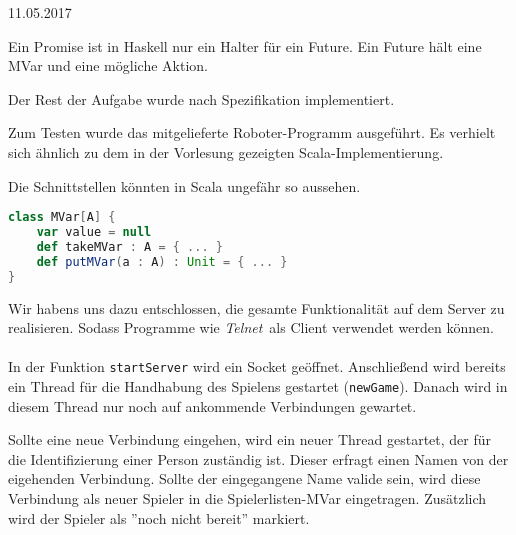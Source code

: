\documentclass{rp}
\begin{document}


{11.05.2017} %

%
Ein Promise ist in Haskell nur ein Halter für ein Future. Ein Future hält eine MVar und eine mögliche Aktion.

Der Rest der Aufgabe wurde nach Spezifikation implementiert. 

Zum Testen wurde das mitgelieferte Roboter-Programm ausgeführt. Es verhielt sich ähnlich zu dem in der Vorlesung gezeigten Scala-Implementierung.

Die Schnittstellen könnten in Scala ungefähr so aussehen. 
\begin{lstlisting}[language=scala]
class MVar[A] {
    var value = null
    def takeMVar : A = { ... }
    def putMVar(a : A) : Unit = { ... }
}
\end{lstlisting}

Wir habens uns dazu entschlossen, die gesamte Funktionalität auf dem Server zu realisieren. Sodass Programme wie \textit{Telnet} als Client verwendet werden können.\\\\

In der Funktion \texttt{startServer} wird ein Socket geöffnet. Anschließend wird bereits ein Thread für die Handhabung des Spielens gestartet (\texttt{newGame}). Danach wird in diesem Thread nur noch auf ankommende Verbindungen gewartet. 

Sollte eine neue Verbindung eingehen, wird ein neuer Thread gestartet, der für die Identifizierung einer Person zuständig ist. Dieser erfragt einen Namen von der eigehenden Verbindung. Sollte der eingegangene Name valide sein, wird diese Verbindung als neuer Spieler in die Spielerlisten-MVar eingetragen. Zusätzlich wird der Spieler als ''noch nicht bereit'' markiert. 
\end{document}
